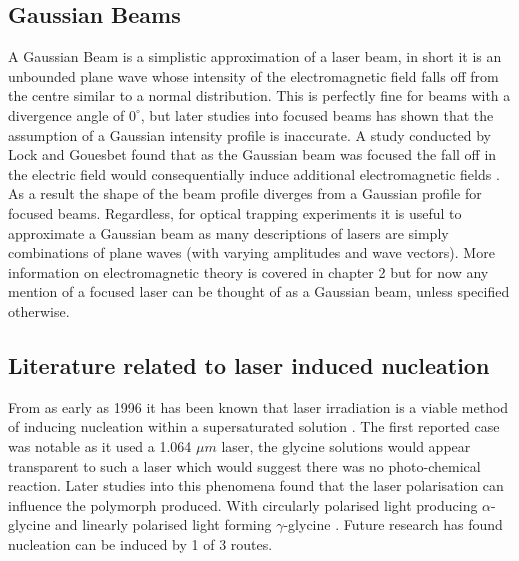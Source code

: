 \subsection{Gaussian Beams}
A Gaussian Beam is a simplistic approximation of a laser beam, in short
it is an unbounded plane wave whose intensity of the electromagnetic 
field falls off from the centre similar to a normal distribution. This 
is perfectly fine for beams with a divergence angle of $0^{\circ}$, but 
later studies into focused beams has shown that the assumption of a 
Gaussian intensity profile is inaccurate. A study conducted by Lock and Gouesbet found that as the Gaussian beam was focused the fall off in 
the electric field would consequentially induce additional electromagnetic fields \cite{Lock1994}. As a result the shape of the beam profile diverges from a Gaussian profile for focused beams. Regardless, for optical trapping experiments it is useful to approximate a Gaussian beam as many descriptions
of lasers are simply combinations of plane waves (with varying amplitudes
and wave vectors). More information on electromagnetic theory is covered in 
chapter 2 but for now any mention of a focused laser can be thought of as a
Gaussian beam, unless specified otherwise. 

\subsection{Literature related to laser induced nucleation}
From as early as 1996 it has been known that laser irradiation is a viable
method of inducing nucleation within a supersaturated solution
\cite{Garetz1996}. The first reported case was notable as it used a 
1.064 $\mu m$ laser, the glycine solutions would appear transparent to
such a laser which would suggest there was no photo-chemical reaction.
Later studies into this phenomena found that the laser polarisation 
can influence the polymorph produced. With circularly polarised light 
producing $\alpha$-glycine and linearly polarised light forming
$\gamma$-glycine \cite{Garetz2002}. Future research has found nucleation 
can be induced by 1 of 3 routes.


